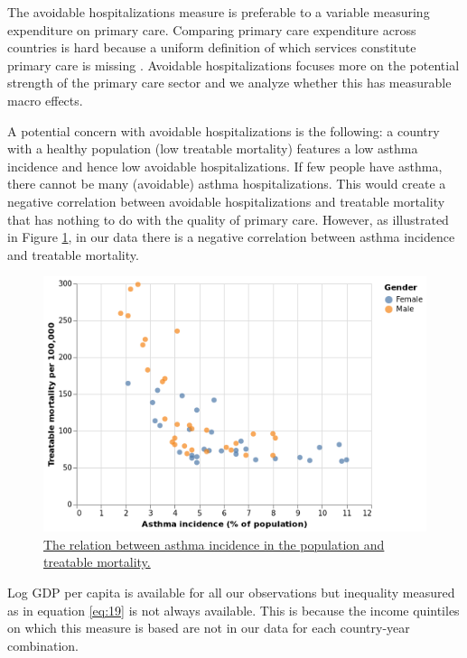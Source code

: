 \documentclass[a4paper,12pt]{article}
\begin{document}
The avoidable hospitalizations measure is preferable to a variable measuring expenditure on primary care. Comparing primary care expenditure across countries is hard because a uniform definition of which services constitute primary care is missing \citep{OECD_2020}. Avoidable hospitalizations focuses more on the potential strength of the primary care sector and we analyze whether this has measurable macro effects.

A potential concern with avoidable hospitalizations is the following: a country with a healthy population (low treatable mortality) features a low asthma incidence and hence low avoidable hospitalizations. If few people have asthma, there cannot be many (avoidable) asthma hospitalizations. This would create a negative correlation between avoidable hospitalizations and treatable mortality that has nothing to do with the quality of primary care. However, as illustrated in Figure \ref{fig:asthma_mortality}, in our data there is a negative correlation between asthma incidence and treatable mortality.

\begin{figure}[htbp]
\centering
\includegraphics[width=.9\linewidth]{./figures/asthma_mortality.png}
\caption{\label{fig:asthma_mortality}\href{https://janboone.github.io/European-Healthcare-Systems/figures/asthma\_mortality.html}{The relation between asthma incidence in the population and treatable mortality.}}
\end{figure}

Log GDP per capita is available for all our observations but inequality measured as in equation \eqref{eq:19} is not always available. This is because the income quintiles on which this measure is based are not in our data for each country-year combination.
\end{document}
